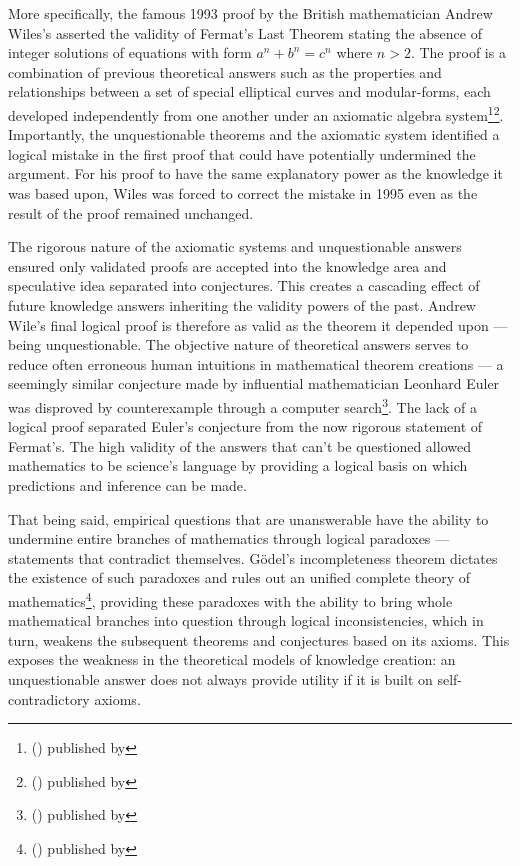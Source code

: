 \documentclass[a4paper,12pt]{article}
\newcommand{\citefoot}[1]{\footnote{\citeall{#1}}}
\newcommand{\citeall}[1]{\citeauth{#1} \citetitle{#1} (\citeyear{#1}) published by \citelist{#1}{publisher}}
\begin{document}
More specifically, the famous 1993 proof by the British mathematician Andrew Wiles's asserted the validity of Fermat's Last Theorem stating the absence of integer solutions of equations with form $a^n + b^n = c^n$ where $n > 2$. The proof is a combination of previous theoretical answers such as the properties and relationships between a set of special elliptical curves and modular-forms, each developed independently from one another under an axiomatic algebra system\citefoot{sakarda_tan_tipirneni_2020}\citefoot{masdeu_2015}. Importantly, the unquestionable theorems and the axiomatic system identified a logical mistake in the first proof that could have potentially undermined the argument. For his proof to have the same explanatory power as the knowledge it was based upon, Wiles was forced to correct the mistake in 1995 even as the result of the proof remained unchanged.

The rigorous nature of the axiomatic systems and unquestionable answers ensured only validated proofs are accepted into the knowledge area and speculative idea separated into conjectures. This creates a cascading effect of future knowledge answers inheriting the validity powers of the past. Andrew Wile's final logical proof is therefore as valid as the theorem it depended upon --- being unquestionable. The objective nature of theoretical answers serves to reduce often erroneous human intuitions in mathematical theorem creations --- a seemingly similar conjecture made by influential mathematician Leonhard Euler was disproved by counterexample through a computer search\citefoot{lander_parkin_1966}. The lack of a logical proof separated Euler's conjecture from the now rigorous statement of Fermat's. The high validity of the answers that can't be questioned allowed mathematics to be science's language by providing a logical basis on which predictions and inference can be made.

That being said, empirical questions that are unanswerable have the ability to undermine entire branches of mathematics through logical paradoxes --- statements that contradict themselves. G\"odel's incompleteness theorem dictates the existence of such paradoxes and rules out an unified complete theory of mathematics\citefoot{bellos_2022}, providing these paradoxes with the ability to bring whole mathematical branches into question through logical inconsistencies, which in turn, weakens the subsequent theorems and conjectures based on its axioms. This exposes the weakness in the theoretical models of knowledge creation: an unquestionable answer does not always provide utility if it is built on self-contradictory axioms.
\end{document}
